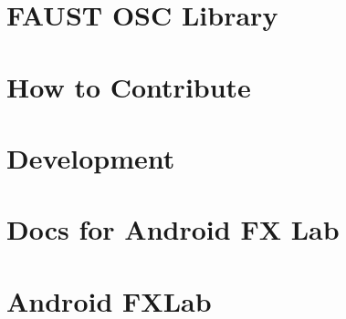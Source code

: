 \let\mypdfximage\pdfximage\def\pdfximage{\immediate\mypdfximage}\documentclass[twoside]{book}
\newcommand{\+}{\discretionary{\mbox{\scriptsize$\hookleftarrow$}}{}{}}
\begin{document}
\chapter{F\+A\+U\+ST O\+SC Library}
\label{md__c_1__users_fab_src__github_branches__neural_amp_modeler_plugin_i_plug2__dependencies__build_863278fba9e533eccb5c722e766b9443}

\chapter{How to Contribute}
\label{md__c_1__users_fab_src__github_branches__neural_amp_modeler_plugin_i_plug2__dependencies__build_60b7360bc4be3327e5671b99605b0920}

\chapter{Development}
\label{md__c_1__users_fab_src__github_branches__neural_amp_modeler_plugin_i_plug2__dependencies__build_cfe412c858c17411575c9d3d3d9b332d}

\chapter{Docs for Android FX Lab}
\label{md__c_1__users_fab_src__github_branches__neural_amp_modeler_plugin_i_plug2__dependencies__build_a2b5f8bcc6e7643df48aa0cd6bf95a33}

\chapter{Android F\+X\+Lab}
\label{md__c_1__users_fab_src__github_branches__neural_amp_modeler_plugin_i_plug2__dependencies__build_cd18b87fae90380af6b0fc36f20b47cc}

\end{document}
